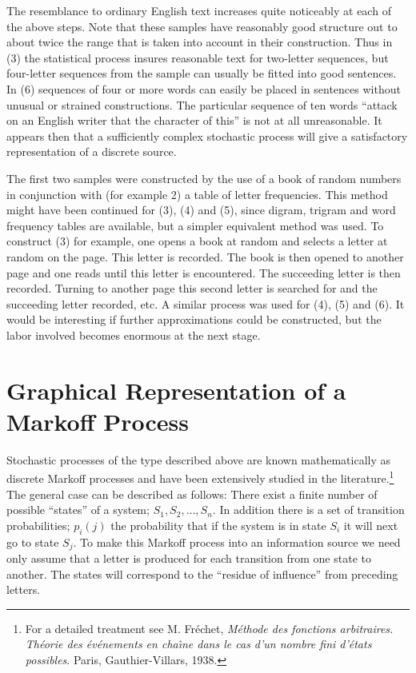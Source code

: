 The resemblance to ordinary English text increases quite noticeably
at each of the above steps.  Note that these samples have reasonably
good structure out to about twice the range that is taken into account
in their construction.  Thus in (3) the statistical process insures
reasonable text for two-letter sequences, but four-letter sequences from
the sample can usually be fitted into good sentences.  In (6) sequences
of four or more words can easily be placed in sentences without unusual or
strained constructions.  The particular sequence of ten words ``attack on
an English writer that the character of this'' is not at all unreasonable.
It appears then that a sufficiently complex stochastic process will give
a satisfactory representation of a discrete source.

The first two samples were constructed by the use of a book of random
numbers in conjunction with (for example 2) a table of letter frequencies.
This method might have been continued for (3), (4) and (5), since digram,
trigram and word frequency tables are available, but a simpler equivalent
method was used.  To construct (3) for example, one opens a book at random
and selects a letter at random on the page.  This letter is recorded.
The book is then opened to another page and one reads until this letter
is encountered.  The succeeding letter is then recorded.  Turning to
another page this second letter is searched for and the succeeding
letter recorded, etc.  A similar process was used for (4), (5) and (6).
It would be interesting if further approximations could be constructed,
but the labor involved becomes enormous at the next stage.

\section{Graphical Representation of a Markoff Process}

Stochastic processes of the type described above are known mathematically
as discrete Markoff processes and have been extensively studied in
the literature.\footnote{For a detailed treatment see M. Fr\'echet,
{\it M\'ethode des fonctions arbitraires.  Th\'eorie des \'ev\'enements
en cha\^{\i}ne dans le cas d'un nombre fini d'\'etats possibles}.  Paris,
Gauthier-Villars, 1938.} The general case can be described as follows:
There exist a finite number of possible ``states'' of a system;
$S_1,S_2,\dots,S_n$.  In addition there is a set of transition
probabilities; $p_i(j)$ the probability that if the system is in state $S_i$
it will next go to state $S_j$.  To make this Markoff process into an
information source we need only assume that a letter is produced for each
transition from one state to another.  The states will correspond to the
``residue of influence'' from preceding letters.

